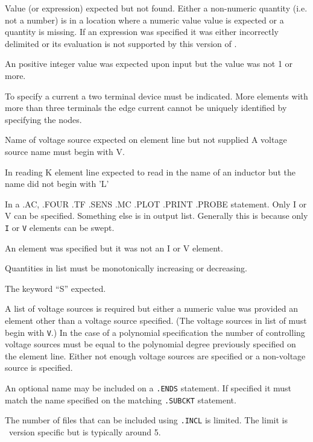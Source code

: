 Value (or expression) expected but not found. Either a non-numeric quantity (i.e.
not a number) is in a location where a numeric value value is expected or a
quantity is missing.  If an expression was specified it was either incorrectly
delimited or its evaluation is not supported by this version of \spice.

An positive integer value was expected upon input but the value was not 1 or more.

To specify a current a two terminal device must be indicated.
More elements with more than three terminals the edge current cannot be
uniquely identified by specifying the nodes.

Name of voltage source expected on element line but not supplied
A voltage source name must begin with V.

In reading K element line expected to read in the name of
an  inductor but the name did not begin with 'L'

In a .AC, .FOUR .TF .SENS .MC .PLOT .PRINT .PROBE statement.
Only I or V can be specified. Something else is in output list.
Generally this is because only {\tt I} or {\tt V} elements can be swept.

An element was specified but it was not an I or V element.

Quantities in list must be monotonically increasing or decreasing.

The keyword ``S'' expected.

A list of voltage sources is required but either a numeric value was provided
an element other than a voltage source specified.
(The voltage sources in list of must begin with {\tt V}.)
In the case of a polynomial specification
the number of controlling voltage sources must be equal to the polynomial
degree previously specified on the element line.  Either not enough
voltage sources are specified or a non-voltage source is specified.

An optional name may be included on a {\tt .ENDS} statement. If specified it must
match the name specified on the matching {\tt .SUBCKT} statement.

The number of files that can be included  using {\tt .INCL} is limited.
The limit is \spice\ version specific but is typically around 5.

